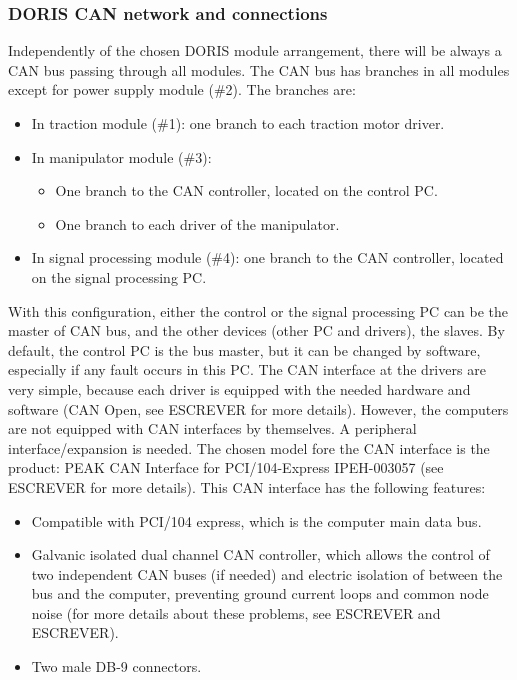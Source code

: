 \subsubsection{DORIS CAN network and connections}
Independently of the chosen DORIS module arrangement, there will be always a CAN bus passing through all modules. The CAN bus has branches in all modules except for power supply module (\#2). The branches are:
\begin{itemize}
  \item In traction module (\#1): one branch to each traction motor driver.
  \item In manipulator module (\#3):
  \begin{itemize}
    \item One branch to the CAN controller, located on the control PC.
    \item One branch to each driver of the manipulator.
  \end{itemize}
  \item In signal processing module (\#4): one branch to the CAN controller, located on the signal processing PC.
\end{itemize}
With this configuration, either the control or the signal processing PC can be the master of CAN bus, and the other devices (other PC and drivers), the slaves. By default, the control PC is the bus master, but it can be changed by software, especially if any fault occurs in this PC.
\newline
The CAN interface at the drivers are very simple, because each driver is equipped with the needed hardware and software (CAN Open, see ESCREVER for more details). However, the computers are not equipped with CAN interfaces by themselves. A peripheral interface/expansion is needed. The chosen model fore the CAN interface is the product: PEAK CAN Interface for PCI/104-Express IPEH-003057 (see ESCREVER for more details). This CAN interface has the following features:
\begin{itemize}
  \item Compatible with PCI/104 express, which is the computer main data bus.
  \item Galvanic isolated dual channel CAN controller, which allows the control of two independent CAN buses (if needed) and electric isolation of between the bus and the computer, preventing ground current loops and common node noise (for more details about these problems, see ESCREVER and ESCREVER).
  \item Two male DB-9 connectors.
\end{itemize}

